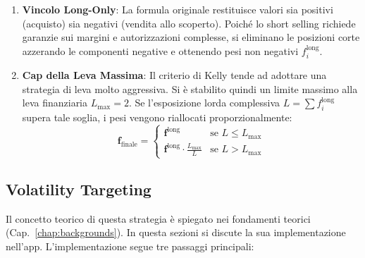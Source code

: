 \begin{enumerate}
    \item \textbf{Vincolo Long-Only}: La formula originale restituisce valori sia positivi (acquisto) sia negativi (vendita allo scoperto). Poiché lo short selling richiede garanzie sui margini e autorizzazioni complesse, si eliminano le posizioni corte azzerando le componenti negative e ottenendo pesi non negativi $f_i^{\text{long}}$.

    \item \textbf{Cap della Leva Massima}: Il criterio di Kelly tende ad adottare una strategia di leva molto aggressiva. Si è stabilito quindi un limite massimo alla leva finanziaria $L_{\max} = 2$. Se l'esposizione lorda complessiva $L = \sum f_i^{\text{long}}$ supera tale soglia, i pesi vengono riallocati proporzionalmente:
    \begin{equation}
        \mathbf{f}_{\text{finale}} = 
        \begin{cases} 
            \mathbf{f}^{\text{long}} & \text{se } L \le L_{\max} \\ 
            \mathbf{f}^{\text{long}} \cdot \frac{L_{\max}}{L} & \text{se } L > L_{\max} 
        \end{cases}
    \end{equation}
\end{enumerate}



\subsection{Volatility Targeting}
\label{sec:target_volatility}

Il concetto teorico di questa strategia è spiegato nei fondamenti teorici (Cap.~\ref{chap:backgrounds}).
In questa sezioni si discute la sua implementazione nell'app.
L'implementazione segue tre passaggi principali:

